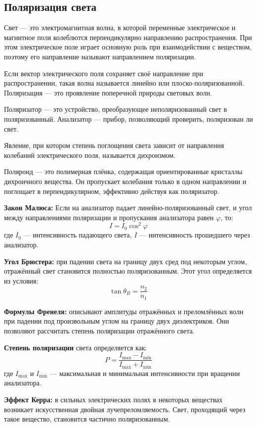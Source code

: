 \documentclass[12pt]{article}
\begin{document}
\subsection{Поляризация света}

Свет — это электромагнитная волна, в которой переменные электрическое и магнитное поля колеблются перпендикулярно направлению распространения. При этом электрическое поле играет основную роль при взаимодействии с веществом, поэтому его направление называют направлением поляризации.

Если вектор электрического поля сохраняет своё направление при распространении, такая волна называется линейно или плоско-поляризованной. Поляризация — это проявление поперечной природы световых волн.

Поляризатор — это устройство, преобразующее неполяризованный свет в поляризованный. Анализатор — прибор, позволяющий проверить, поляризован ли свет.

Явление, при котором степень поглощения света зависит от направления колебаний электрического поля, называется дихроизмом. 

Поляроид — это полимерная плёнка, содержащая ориентированные кристаллы дихроичного вещества. Он пропускает колебания только в одном направлении и поглощает в перпендикулярном, эффективно действуя как поляризатор.

\textbf{Закон Малюса:}
Если на анализатор падает линейно-поляризованный свет, и угол между направлениями поляризации и пропускания анализатора равен $\varphi$, то:
\[
I = I_0 \cos^2 \varphi
\]
где $I_0$ — интенсивность падающего света, $I$ — интенсивность прошедшего через анализатор.

\textbf{Угол Брюстера:} при падении света на границу двух сред под некоторым углом, отражённый свет становится полностью поляризованным. Этот угол определяется из условия:
\[
\tan \theta_B = \frac{n_2}{n_1}
\]

\textbf{Формулы Френеля:} описывают амплитуды отражённых и преломлённых волн при падении под произвольным углом на границу двух диэлектриков. Они позволяют рассчитать степень поляризации отражённого света.

\textbf{Степень поляризации} света определяется как:
\[
P = \frac{I_{\max} - I_{\min}}{I_{\max} + I_{\min}}
\]
где $I_{\max}$ и $I_{\min}$ — максимальная и минимальная интенсивности при вращении анализатора.

\textbf{Эффект Керра:} в сильных электрических полях в некоторых веществах возникает искусственная двойная лучепреломляемость. Свет, проходящий через такое вещество, становится частично поляризованным.
\end{document}
